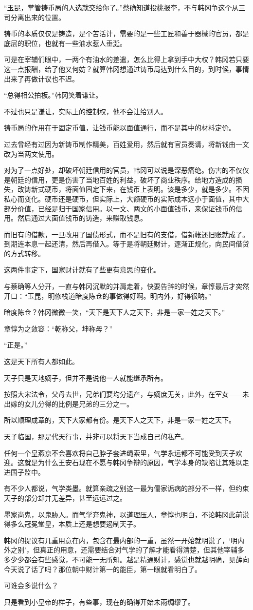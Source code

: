 “玉昆，掌管铸币局的人选就交给你了。”蔡确知道投桃报李，不与韩冈争这个从三司分离出来的位置。

铸币的本质仅仅是铸造，是个苦活计，需要的是一些工匠和善于器械的官员，都是底层的职位，也就有一些油水惹人垂涎。

可是在宰辅们眼中，一两个有油水的差遣，怎么比得上拿到手中大权？韩冈若只要这一点报酬，给了他又何妨？就算韩冈想通过铸币局达到什么目的，到时候，事情出来了再做计议也不迟。

“总得相公拍板。”韩冈笑着谦让。

不过也只是谦让，实际上的控制权，他不会让给别人。

铸币局的作用在于固定币值，让钱币能以面值通行，而不是其中的材料定价。

过去曾经有过因为新铸币制作精美，百姓爱用，然后就有官员奏请，将新钱由一文改为当两文使用。

对为了一点好处，却破坏朝廷信用的官员，韩冈可以说是深恶痛绝。伤害的不仅仅是朝廷的信用，更是伤害了当地百姓的利益，破坏了商业秩序。给地方造成的损失，改铸新式硬币，将面值固定下来，在钱币上表明。该是多少，就是多少。不因私心而变化。硬币还是硬币，但实际上，大额硬币的实际成本远小于面值，其中大部分价值，已经是归于国家信用。以一文、两文的小面值钱币，来保证钱币的信用。然后通过大面值钱币的铸造，来赚取钱息。

而旧有的借款，一旦改用了国债形式，而不是旧有的支借，借新帐还旧账就成了。到期连本息一起还清，然后再借入。等于是将朝廷财计，逐渐正规化，向民间借贷的方式转移。

这两件事定下，国家财计就有了些更有意思的变化。

与蔡确等人分开，一直与韩冈沉默的并肩走着，快要告辞的时候，章惇最后才突然开口：“玉昆，明修栈道暗度陈仓的事做得好啊。明内外，好得很呐。”

暗度陈仓？韩冈微微一笑，“天下是天下人之天下，非是一家一姓之天下。”

章惇为之敛容：“乾称父，坤称母？”

“正是。”

这是天下所有人都如此。

天子只是天地嫡子，但并不是说他一人就能继承所有。

按照大宋法令，父母去世，兄弟们要均分遗产，与嫡庶无关，此外，在室女——未出嫁的女儿分得的比例是兄弟的三分之一。

所以顺理成章的，天下大家都有份。是天下人之天下，非是一家一姓之天下。

天子临国，那是代天行事，并非可以将天下当成自己的私产。

任何一个皇燕京不会喜欢将自己脖子套进绳索里，气学永远都不可能受到天子欢迎。这就是为什么王安石现在不愿与韩冈争辩的原因，气学本身的缺陷让其难以走进国子监中。

有不少人都说，气学类墨。就算亲疏之别这一最为儒家诟病的部分不一样，但约束天子的部分却并无差异，甚至远远过之。

墨家尚鬼，以鬼胁人。而气学弃鬼神，以道理压人，章惇也明白，不论韩冈此前说得多么冠冕堂皇，本质上还是想要遏制天子。

韩冈的提议有几重用意在内，包含在最内部的一重，虽然一开始就明说了，‘明内外之别’，但真正的用意，还需要结合对气学的了解才能看得清楚，但其他宰辅多多少少都会有些感觉，不可能一无所知。越是精通财计，感觉也就越明确，见薛向今天说了话了吗？那位朝中财计第一的能臣，第一眼就看明白了。

可谁会多说什么？

只是看到小皇帝的样子，有些事，现在的确得开始未雨绸缪了。

